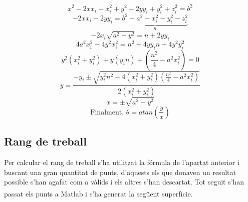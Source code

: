\[x^2 - 2xx_i + x_i^2 + y^2 - 2yy_i + y_i^2 + z_i^2 = b^2\]
\[-2xx_i - 2yy_i = \underbrace{b^2 - a^2 - x_i^2 - y_i^2 - z_i^2}_{n}\]
\[-2x_i\sqrt{a^2-y^2}=n+2yy_i\]
\[4a^2x_i^2-4y^2x_i^2=n^2+4yy_in+4y^2y_i^2\]
\[y^2(x_i^2+y_i^2)+y(y_in)+(\frac{n^2}{4}-a^2x_i^2)=0\]
\[y=\frac{-y_i\pm\sqrt{y_i^2n^2-4(x_i^2+y_i^2)(\frac{n^2}{4}-a^2x_i^2)}}{2(x_i^2+y_i^2)}\]
\[x=\pm\sqrt{a^2-y^2}\]
\[\textrm{Finalment, }\theta=atan(\frac{y}{x})\]

\subsection{Rang de treball}

Per calcular el rang de treball s'ha utilitzat la fórmula de l'apartat anterior i buscant una gran quantitat de punts, d'aquests els que donaven un resultat possible s'han agafat com a vàlids i els altres s'han descartat. Tot seguit s'han passat els punts a Matlab\textsuperscript{\textregistered} i s'ha generat la següent superfície.

